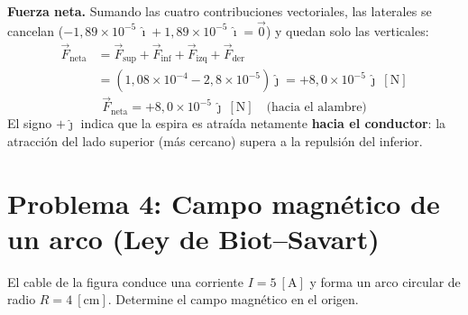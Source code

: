 \documentclass[12pt,letterpaper]{article}
\begin{document}
\medskip
\noindent\textbf{Fuerza neta.} Sumando las cuatro contribuciones vectoriales, las laterales se
cancelan ($-1{,}89\times10^{-5}\,\hat{\imath}+1{,}89\times10^{-5}\,\hat{\imath}=\vec{0}$) y quedan
solo las verticales:
\begin{align*}
    \vec{F}_{\text{neta}} &= \vec{F}_{\text{sup}}+\vec{F}_{\text{inf}}+\vec{F}_{\text{izq}}+\vec{F}_{\text{der}} \\[2pt]
    &= \left(1{,}08\times10^{-4} - 2{,}8\times10^{-5}\right)\hat{\jmath}
    = +8{,}0\times10^{-5}\,\hat{\jmath}\ [\text{N}]
\end{align*}
\[
    \boxed{\vec{F}_{\text{neta}} = +8{,}0\times10^{-5}\,\hat{\jmath}\ [\text{N}]\quad\text{(hacia el alambre)}}
\]
El signo $+\hat{\jmath}$ indica que la espira es atra\'ida netamente \textbf{hacia el conductor}:
la atracci\'on del lado superior (m\'as cercano) supera a la repulsi\'on del inferior.

\newpage

\section*{Problema 4: Campo magn\'etico de un arco (Ley de Biot--Savart)}

\noindent El cable de la figura conduce una corriente $I = 5\ [\text{A}]$ y forma un arco
circular de radio $R = 4\ [\text{cm}]$. Determine el campo magn\'etico en el origen.

\medskip
\end{document}
